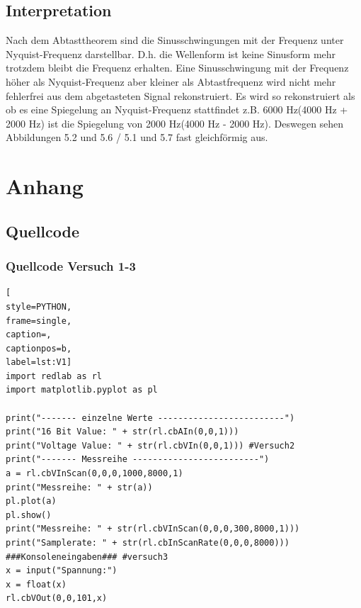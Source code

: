 \documentclass[12pt, oneside, a4paper, \docLanguage]{report}
\begin{document}
\section{Interpretation}
\label{chap:VERSUCH_5_INTERPRETATION}
\qquad Nach dem Abtasttheorem sind die Sinusschwingungen mit der Frequenz unter Nyquist-Frequenz darstellbar. D.h. die Wellenform ist keine Sinusform mehr trotzdem bleibt die Frequenz erhalten. Eine Sinusschwingung mit der Frequenz höher als Nyquist-Frequenz aber kleiner als Abtastfrequenz wird nicht mehr fehlerfrei aus dem abgetasteten Signal rekonstruiert. Es wird so rekonstruiert als ob es eine Spiegelung an Nyquist-Frequenz stattfindet z.B. 6000 Hz(4000 Hz + 2000 Hz) ist die Spiegelung von 2000 Hz(4000 Hz - 2000 Hz). Deswegen sehen Abbildungen 5.2 und 5.6 / 5.1 und 5.7 fast gleichförmig aus.



%
%
\renewcommand\thesection{A.\arabic{section}}
\renewcommand\thesubsection{\thesection.\arabic{subsection}}

\chapter*{Anhang}
\label{chap:APPENDIX}
\addtocounter{chapter}{1}
\setcounter{section}{0}

\section{Quellcode}
\label{chap:APPENDIX_SOURCECODE}

\subsection{Quellcode Versuch 1-3}
\label{chap:APPENDIX_SOURCECODE_V1}
\begin{lstlisting}[
style=PYTHON,
frame=single,
caption=,
captionpos=b,
label=lst:V1]
import redlab as rl
import matplotlib.pyplot as pl

print("------- einzelne Werte -------------------------")
print("16 Bit Value: " + str(rl.cbAIn(0,0,1)))
print("Voltage Value: " + str(rl.cbVIn(0,0,1))) #Versuch2
print("------- Messreihe -------------------------")
a = rl.cbVInScan(0,0,0,1000,8000,1)
print("Messreihe: " + str(a))
pl.plot(a)
pl.show()
print("Messreihe: " + str(rl.cbVInScan(0,0,0,300,8000,1)))
print("Samplerate: " + str(rl.cbInScanRate(0,0,0,8000)))
###Konsoleneingaben### #versuch3
x = input("Spannung:")
x = float(x)
rl.cbVOut(0,0,101,x) 
\end{lstlisting}
\end{document}

